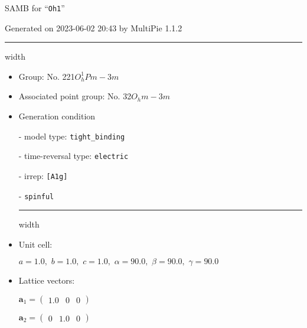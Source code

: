 \documentclass[fleqn,10pt,landscape]{article}
\begin{document}
\setcounter{MaxMatrixCols}{16}

\setlength{\baselineskip}{16pt}
\footnotesize
\begin{center}
\LARGE
SAMB for ``\texttt{Oh1}''
\end{center}
\begin{flushright}
Generated on 2023-06-02 20:43 by MultiPie 1.1.2
\end{flushright}
\vspace{1cm}


 \hfil \hrule height 1mm width \textwidth \hfil

\begin{itemize}
\item Group: No. 221\quad$O_{h}^{1}$\quad$Pm-3m$\quad[ cubic ]

\item Associated point group: No. 32\quad$O_{h}$\quad$m-3m$\quad[ cubic ]

\vspace{5mm}

\item Generation condition

\quad - model type: \texttt{tight_binding}

\quad - time-reversal type: \texttt{electric}

\quad - irrep: \texttt{[A1g]}

\quad - \texttt{spinful}


 \hfil \hrule height 1mm width \textwidth \hfil

\item Unit cell:

\quad $a=1.0,\,\, b=1.0,\,\, c=1.0,\,\, \alpha=90.0,\,\, \beta=90.0,\,\, \gamma=90.0$

\item Lattice vectors:

\quad $\bm{a}_1=\begin{pmatrix} 1.0 & 0 & 0 \end{pmatrix}$

\quad $\bm{a}_2=\begin{pmatrix} 0 & 1.0 & 0 \end{pmatrix}$


\end{itemize}
\end{document}
